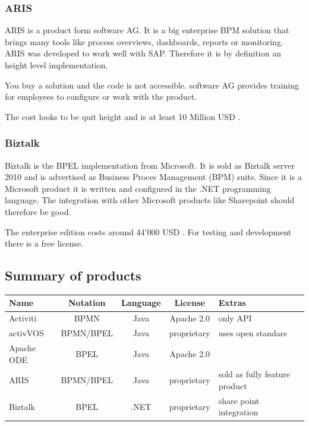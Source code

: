 \documentclass[paper=a4,twoside=false,BCOR=0mm,DIV=calc,fontsize=12pt]{scrartcl}
\begin{document}
\subsubsection{ARIS}
ARIS \cite{aris} is a product form software AG. It is a big enterprise BPM solution that brings many tools like process overviews, dashboards, reports or monitoring. ARIS was developed to work well with SAP. Therefore it is by definition an height level implementation.

You buy a solution and the code is not accessible. software AG provides training for employees to configure or work with the product. 

The cost looks to be quit height and is at least 10 Million USD \cite{ariscost}.


\subsubsection{Biztalk}
Biztalk \cite{biztalk} is the BPEL implementation from Microsoft. It is sold as Biztalk server 2010 and is advertised as Business Proces Management (BPM) suite. Since it is a Microsoft product it is written and configured in the .NET programming language. The integration with other Microsoft products like Sharepoint should therefore be good.

The enterprise edition costs around 44'000 USD \cite{biztalkcost}. For testing and development there is a free license.


\subsection{Summary of products}

\begin{center}
\begin{tabular}{l | c c c p{3cm}}
\toprule

Name & Notation & Language & License & Extras \\

\midrule

Activiti & BPMN & Java & Apache 2.0 & only API \\
activVOS & BPMN/BPEL & Java & proprietary &  uses open standars \\
Apache ODE & BPEL & Java & Apache 2.0 &   \\
ARIS & BPMN/BPEL & Java & proprietary &  sold as fully feature product \\
Biztalk & BPEL & .NET & proprietary &  share point integration \\


\bottomrule
\end{tabular}

\label{tab:enginecomparison}
\end{center}
\end{document}
